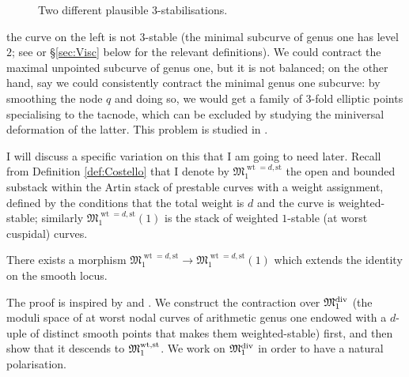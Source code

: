 \begin{rmk}
\begin{figure}[h]
\caption{Two different plausible $3$-stabilisations.}
\end{figure}
the curve on the left is not $3$-stable (the minimal subcurve of genus one has level $2$; see \cite{SMY1} or \S \ref{sec:Visc} below for the relevant definitions). We could contract the maximal unpointed subcurve of genus one, but it is not balanced; on the other hand, say we could consistently contract the minimal genus one subcurve: by smoothing the node $q$ and doing so, we would get a family of $3$-fold elliptic points specialising to the tacnode, which can be excluded by studying the miniversal deformation of the latter. This problem is studied in \cite[\S 4.1]{SMY2}. \end{rmk}
I will discuss a specific variation on this \cite[Theorem 4.4]{BCM} that I am going to need later. Recall from Definition \ref{def:Costello} that I denote by $\mathfrak M_{1}^{\operatorname{wt}=d,\text{st}}$ the open and bounded substack within the Artin stack of prestable curves with a weight assignment, defined by the conditions that the total weight is $d$ and the curve is weighted-stable; similarly $\mathfrak M_{1}^{\operatorname{wt}=d,\text{st}}(1)$ is the stack of weighted $1$-stable (at worst cuspidal) curves.
\begin{prop}\label{prop:1-stab}
There exists a morphism $\mathfrak M_{1}^{\operatorname{wt}=d,\text{st}}\to\mathfrak M_{1}^{\operatorname{wt}=d,\text{st}}(1)$ which extends the identity on the smooth locus.
\end{prop}

The proof is inspired by \cite[\S2]{HassettHyeon} and \cite[\S3.7]{RSPW}. We construct the contraction over $\mathfrak M_1^{\rm{div}}$ (the moduli space of at worst nodal curves of arithmetic genus one endowed with a $d$-uple of distinct smooth points that makes them weighted-stable) first, and then show that it descends to $\mathfrak M_1^{\rm{wt,st}}$. We work on $\mathfrak M_1^{\rm{div}}$ in order to have a natural polarisation.

